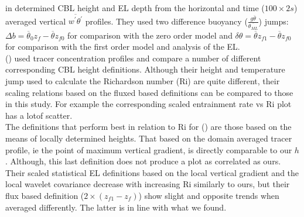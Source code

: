 \citeauthor{FedConzMir04} in \cite{FedConzMir04} determined \acs{CBL} height and \acs{EL} depth from the horizontal and time ($100 \times 2s$) averaged vertical $\overline{w^{'}\theta^{'}}$ profiles.  They used two difference buoyancy ($\frac{g\overline{\theta}}{\overline{\theta_{ML}}}$) jumps: $\Delta b = \overline{\theta}_{0}z_{f} - \overline{\theta}z_{f0}$ for comparison with the zero order model and $\delta \theta = \overline{\theta}z_{f1} - \overline{\theta}z_{f0}$ for comparison with the first order model and analysis of the \acs{EL}.\\  



\citeauthor{BrooksFowler2} (\cite{BrooksFowler2}) used tracer concentration profiles and compare a number of different corresponding \acs{CBL} height definitions.  Although their height and temperature jump used to calculate the Richardson number (\acs{Ri}) are quite different, their scaling relations based on the fluxed based definitions can be compared to those in this study. For example the corresponding scaled entrainment rate vs \acs{Ri} plot has a lotof scatter.\\

The definitions that perform best in relation to \acs{Ri} for \citeauthor{BrooksFowler2} (\cite{BrooksFowler2}) are those based on the means of locally determined heights.  That based on the domain averaged tracer profile, ie the point of maximum vertical gradient, is directly comparable to our $h$. Although, this last definition does not produce a plot as correlated as ours.\\  

Their scaled statistical \acs{EL} definitions based on the local vertical gradient and the local wavelet covariance decrease with increasing \acs{Ri} similarly to ours, but their flux based definition ($2\times(z_{f1}-z_{f})$) show slight and opposite trends when averaged differently.  The latter is in line with what we found.\\



